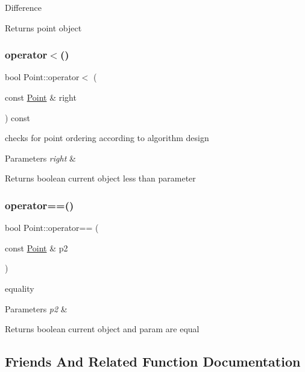 Difference \begin{DoxyReturn}{Returns}
point object 
\end{DoxyReturn}
\mbox{\label{class_point_a2d285a505e84d64a96974d5247e8ae7a}} 
\subsubsection{\texorpdfstring{operator$<$()}{operator<()}}
{\footnotesize\ttfamily bool Point\+::operator$<$ (\begin{DoxyParamCaption}\item[{const \mbox{\hyperlink{class_point}{Point}} \&}]{right }\end{DoxyParamCaption}) const}

checks for point ordering according to algorithm design 
\begin{DoxyParams}{Parameters}
{\em right} & \\
\hline
\end{DoxyParams}
\begin{DoxyReturn}{Returns}
boolean current object less than parameter 
\end{DoxyReturn}
\mbox{\label{class_point_ac7bc64b9a683d5fb35780c739779f2fc}} 
\subsubsection{\texorpdfstring{operator==()}{operator==()}}
{\footnotesize\ttfamily bool Point\+::operator== (\begin{DoxyParamCaption}\item[{const \mbox{\hyperlink{class_point}{Point}} \&}]{p2 }\end{DoxyParamCaption})}

equality 
\begin{DoxyParams}{Parameters}
{\em p2} & \\
\hline
\end{DoxyParams}
\begin{DoxyReturn}{Returns}
boolean current object and param are equal 
\end{DoxyReturn}


\subsection{Friends And Related Function Documentation}
\mbox{\label{class_point_a2c120859855730a5ff9d2eaee48471c5}} 
